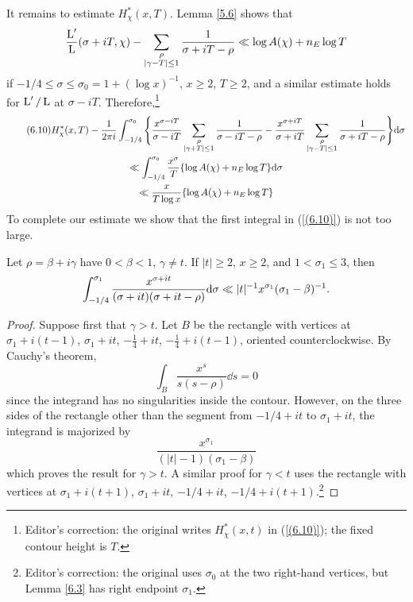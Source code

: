 \documentclass[./main]{subfiles}
\begin{document}
It remains to estimate $H_{\chi}^{*}(x,T)$. Lemma \ref{5.6} shows that 
\[\frac{\operatorname{L}'}{\operatorname{L}}(\sigma + iT, \chi) - \sum_{\substack{\rho \\ |\gamma - T| \leq 1}} \frac{1}{\sigma + iT - \rho} \ll \log A(\chi) + n_E \log T
\]
if $-1/4 \leq \sigma \leq \sigma_0 = 1 + (\log x)^{-1}$, $x \geq 2$, $T \geq 2$, and a similar estimate holds for $\operatorname{L}'/\operatorname{L}$ at $\sigma - iT$. Therefore,\footnote{Editor's correction: the original writes $H_\chi^*(x,t)$ in (\ref{(6.10)}); the fixed contour height is $T$.}
\begin{multline}\tag{6.10}\label{(6.10)}
    H_{\chi}^{*}(x,T) - \frac{1}{2\pi i} \int_{-1/4}^{\sigma_0} \Bigg\{ \frac{x^{\sigma - iT}}{\sigma - iT} \sum_{\substack{\rho \\ |\gamma +  T| \leq 1 }} \frac{1}{\sigma - iT -\rho} - \frac{x^{\sigma + iT}}{\sigma + iT} \sum_{\substack{\rho \\ |\gamma - T| \leq 1}} \frac{1}{\sigma + iT - \rho}\Bigg\} \mathrm{d}{\sigma} \\
    \ll \int_{-1/4}^{\sigma_0} \frac{x^{\sigma}}{T} \{ \log A(\chi) + n_E \log T \} \mathrm{d}{\sigma} \\\ll \frac{x}{T\log x} \{\log A(\chi) + n_E \log T\}
\end{multline}
To complete our estimate we show that the first integral in (\ref{(6.10)}) is not too large. 
\begin{lemma}\label{6.3}
Let $\rho = \beta + i \gamma$ have $0 < \beta < 1$, $\gamma \neq t$. If $|t| \geq 2$, $x \geq 2$, and $1 < \sigma_1 \leq 3$, then 
\[ \int_{-1/4}^{\sigma_1} \frac{x^{\sigma + it}}{(\sigma + it) (\sigma + it - \rho)} \mathrm{d}{\sigma} \ll |t|^{-1}x^{\sigma_1}(\sigma_1 - \beta)^{-1}.
\]
\end{lemma}
\begin{proof}
Suppose first that $\gamma > t$. Let $B$ be the rectangle with vertices at \\ $\sigma_1 + i(t-1)$, $\sigma_1 + it$, $-\frac{1}{4}+it$, $-\frac{1}{4} + i(t-1)$, oriented counterclockwise. By Cauchy's theorem, 
\[ \int_{B} \frac{x^s}{s(s-\rho)} \dd{s} = 0
\]
since the integrand has no singularities inside the contour. However, on the three sides of the rectangle other than the segment from $-1/4 + it$ to $\sigma_1 + it$, the integrand is majorized by 
\[ \frac{x^{\sigma_1}}{(|t| - 1)(\sigma_1 - \beta)}
\]
which proves the result for $\gamma > t$. A similar proof for $\gamma < t$ uses the rectangle with vertices at $\sigma_1 + i(t+1)$, $\sigma_1 + it$, $-1/4 + it$, $-1/4 + i(t+1)$.\footnote{Editor's correction: the original uses $\sigma_0$ at the two right-hand vertices, but Lemma \ref{6.3} has right endpoint $\sigma_1$.}
\end{proof}
\end{document}
